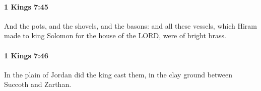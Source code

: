 		\paragraph{1 Kings 7:45} %
			\label{1KINGS-7-45}

			And the pots, and the shovels, and the basons: and all these vessels, which Hiram made to king Solomon for the house of the LORD, were of bright brass.


		\paragraph{1 Kings 7:46} %
			\label{1KINGS-7-46}

			In the plain of Jordan did the king cast them, in the clay ground between Succoth and Zarthan.


